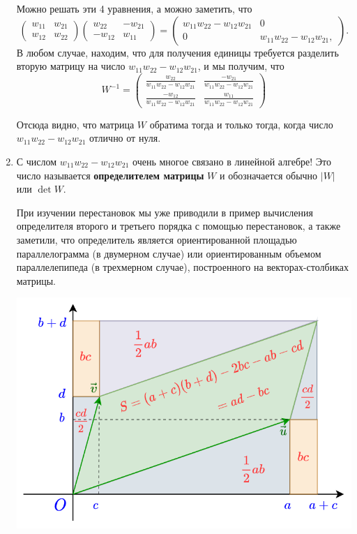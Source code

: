 \begin{enumerate}
Можно решать эти 4 уравнения, а можно заметить, что
$$
\begin{pmatrix}
w_{11} & w_{21} \\ w_{12} & w_{22}
\end{pmatrix}
\begin{pmatrix}
w_{22} & -w_{21} \\ -w_{12} & w_{11}
\end{pmatrix}
=
\begin{pmatrix}
w_{11}w_{22} - w_{12}w_{21} & 0 \\ 
0 & w_{11}w_{22} - w_{12}w_{21},
\end{pmatrix}.
$$
В любом случае, находим, что для получения единицы требуется разделить вторую матрицу на число $w_{11}w_{22} - w_{12}w_{21}$, и мы получим, что
$$
W^{-1} = 
\begin{pmatrix}
\displaystyle\frac{w_{22}}{w_{11}w_{22} - w_{12}w_{21}} & \displaystyle\frac{-w_{21}}{w_{11}w_{22} - w_{12}w_{21}} \\[7pt]
\displaystyle\frac{-w_{12}}{w_{11}w_{22} - w_{12}w_{21}} & \displaystyle\frac{w_{11}}{w_{11}w_{22} - w_{12}w_{21}}
\end{pmatrix}
$$

Отсюда видно, что матрица $W$ обратима тогда и только тогда, когда число $w_{11}w_{22} - w_{12}w_{21}$ отлично от нуля.

\item С числом $w_{11}w_{22} - w_{12}w_{21}$ очень многое связано в линейной алгебре! Это число называется \textbf{определителем матрицы} $W$ и обозначается обычно $|W|$ или $\det W$.

При изучении перестановок мы уже приводили в пример вычисления определителя второго и третьего порядка с помощью перестановок, а также заметили, что определитель является ориентированной площадью параллелограмма (в двумерном случае) или ориентированным объемом параллелепипеда (в трехмерном случае), построенного на векторах-столбиках матрицы.

\begin{center}
\includegraphics[scale=0.3]{paralel.png}
\end{center}


\end{enumerate}
